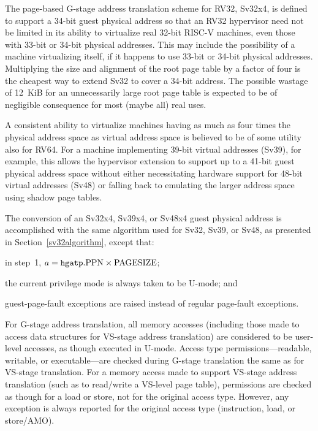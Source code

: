 \begin{commentary}
The page-based G-stage address translation scheme for RV32, Sv32x4, is
defined to support a 34-bit guest physical address so that an RV32 hypervisor
need not be limited in its ability to virtualize real 32-bit RISC-V machines,
even those with 33-bit or 34-bit physical addresses.
This may include the possibility of a machine virtualizing itself, if it
happens to use 33-bit or 34-bit physical addresses.
Multiplying the size and alignment of the root page table by a factor of four
is the cheapest way to extend Sv32 to cover a 34-bit address.
The possible wastage of 12~KiB for an unnecessarily large root page table is
expected to be of negligible consequence for most (maybe all) real uses.

A consistent ability to virtualize machines having as much as four times the
physical address space as virtual address space is believed to be of some
utility also for RV64.
For a machine implementing 39-bit virtual addresses (Sv39), for example, this
allows the hypervisor extension to support up to a 41-bit guest physical
address space without either necessitating hardware support for 48-bit virtual
addresses (Sv48) or falling back to emulating the larger address space using
shadow page tables.
\end{commentary}

The conversion of an Sv32x4, Sv39x4, or Sv48x4 guest physical address is
accomplished with the same algorithm used for Sv32, Sv39, or Sv48, as presented
in Section~\ref{sv32algorithm}, except that:
\begin{compactitem}
\item
in step~1, $a = \mbox{{\tt hgatp}.PPN}\times\mbox{PAGESIZE}$;
\item
the current privilege mode is always taken to be U-mode; and
\item
guest-page-fault exceptions are raised instead of regular page-fault
exceptions.
\end{compactitem}

For G-stage address translation, all memory accesses (including those
made to access data structures for VS-stage address translation) are considered
to be user-level accesses, as though executed in U-mode.
Access type permissions---readable, writable, or executable---are checked
during G-stage translation the same as for VS-stage
translation.
For a memory access made to support VS-stage address translation (such as to
read/write a VS-level page table), permissions are checked as though for a load
or store, not for the original access type.
However, any exception is always reported for the original access type
(instruction, load, or store/AMO).

